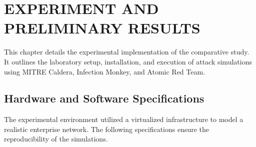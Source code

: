 
\chapter{EXPERIMENT AND PRELIMINARY RESULTS} \label{chap:experiment}
This chapter details the experimental implementation of the comparative study. It outlines the laboratory setup, installation, and execution of attack simulations using MITRE Caldera, Infection Monkey, and Atomic Red Team.

\section{Hardware and Software Specifications}\label{sec:Specifications}
The experimental environment utilized a virtualized infrastructure to model a realistic enterprise network. The following specifications ensure the reproducibility of the simulations.
